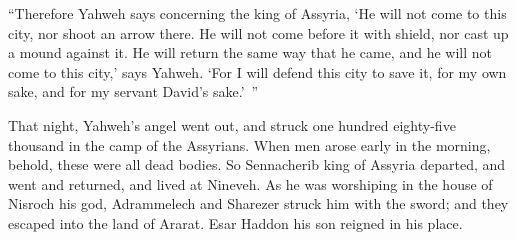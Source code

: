 {\par }{\PP {}“Therefore Yahweh says concerning the king of Assyria, ‘He will not come to this city, nor shoot an arrow there. He will not come before it with shield, nor cast up a mound against it.
He will return the same way that he came, and he will not come to this city,’ says Yahweh.
‘For I will defend this city to save it, for my own sake, and for my servant David’s sake.’ ”
\par }{\PP {}That night, Yahweh’s angel went out, and struck one hundred eighty-five thousand in the camp of the Assyrians. When men arose early in the morning, behold, these were all dead bodies.
So Sennacherib king of Assyria departed, and went and returned, and lived at Nineveh.
As he was worshiping in the house of Nisroch his god, Adrammelech and Sharezer struck him with the sword; and they escaped into the land of Ararat. Esar Haddon his son reigned in his place.

}
